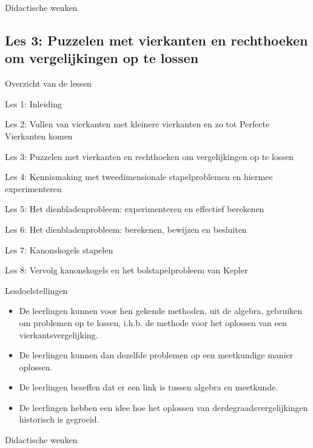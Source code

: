\documentclass[dutch]{beamer}
\begin{document}
\begin{frame}{Didactische wenken}
\end{frame}



\subsection{Les 3: Puzzelen met vierkanten en rechthoeken om vergelijkingen op te lossen}
\begin{frame}
{Overzicht van de lessen}
\begin{list}{\quad}{}
\item Les 1: Inleiding
\item Les 2: Vullen van vierkanten met kleinere vierkanten en zo tot Perfecte Vierkanten komen
\item {\color{blue}Les 3: Puzzelen met vierkanten en rechthoeken om vergelijkingen op te lossen}
\item Les 4: Kennismaking met tweedimensionale stapelproblemen en hiermee experimenteren
\item Les 5: Het dienbladenprobleem: experimenteren en effectief berekenen
\item Les 6: Het dienbladenprobleem: berekenen, bewijzen en besluiten
\item Les 7: Kanonskogels stapelen
\item Les 8: Vervolg kanonskogels en het bolstapelprobleem van Kepler
\end{list}
\end{frame}

\begin{frame}{Lesdoelstellingen}
\begin{itemize}
  \item De leerlingen kunnen voor hen gekende methoden, uit de algebra, gebruiken om problemen op te lossen, i.h.b. de methode voor het oplossen van een vierkantsvergelijking.
  \item De leerlingen kunnen dan dezelfde problemen op een meetkundige manier oplossen.
  \item De leerlingen beseffen dat er een link is tussen algebra en meetkunde.
  \item De leerlingen hebben een idee hoe het oplossen van derdegraadsvergelijkingen historisch is gegroeid.
\end{itemize}
\end{frame}

\begin{frame}{Didactische wenken}
\end{frame}
\end{document}

